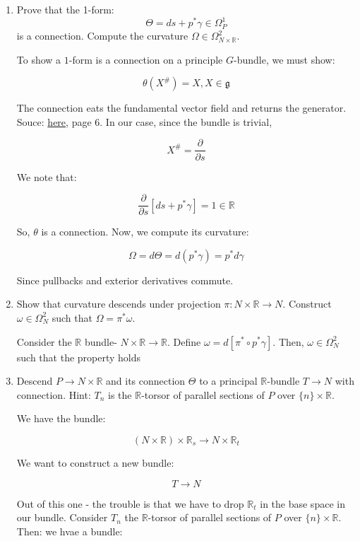 \begin{enumerate}
    \item[(a)] Prove that the 1-form:
    \[
    \Theta = ds + p^* \gamma \in \Omega^1_P
    \]
    is a connection. Compute the curvature $\Omega \in \Omega^2_{N \times \mathbb{R}}$.

    To show a $1$-form is a connection on a principle $G$-bundle, we must show:

    $$\theta(X^{\#}) = X, X \in \mathfrak{g}$$

    The connection eats the fundamental vector field and returns the generator.
    Souce: \href{https://empg.maths.ed.ac.uk/Activities/GT/Lect1.pdf}{here}, page $6$. 
    In our case, since the bundle is trivial, 

    $$X^{\#} = \frac{\partial}{\partial s}$$

    We note that:

    $$\frac{\partial}{\partial s} \left[ ds + p^{*} \gamma \right] = 1 \in \mathbb{R}$$

    So, $\theta$ is a connection. Now, we compute its curvature:

    $$\Omega = d \Theta = d(p^{*} \gamma) = p^{*} d \gamma$$

    Since pullbacks and exterior derivatives commute. 

    \item[(b)] Show that curvature descends under projection $\pi : N \times \mathbb{R} \to N$. Construct $\omega \in \Omega^2_N$ such that $\Omega = \pi^* \omega$.

    Consider the $\mathbb{R}$ bundle- $N \times \mathbb{R} \to \mathbb{R}$. Define $\omega = d \left[\pi^{*} \circ p^{*} \gamma \right]$. Then, $\omega \in \Omega_{N}^{2}$ such that the property holds

    \item[(c)] Descend $P \to N \times \mathbb{R}$ and its connection $\Theta$ to a principal $\mathbb{R}$-bundle $T \to N$ with connection. Hint: $T_n$ is the $\mathbb{R}$-torsor of parallel sections of $P$ over $\{n\} \times \mathbb{R}$.

    We have the bundle:

    $$(N \times \mathbb{R}) \times \mathbb{R}_{s} \to N \times \mathbb{R}_{t}$$

    We want to construct a new bundle:

    $$T \to N$$

    Out of this one - the trouble is that we have to drop $\mathbb{R}_{t}$ in the base space in our bundle. Consider $T_{n}$ the $\mathbb{R}$-torsor of parallel sections of $P$ over $\{n\} \times \mathbb{R}$. Then: we hvae a bundle:


\end{enumerate}
